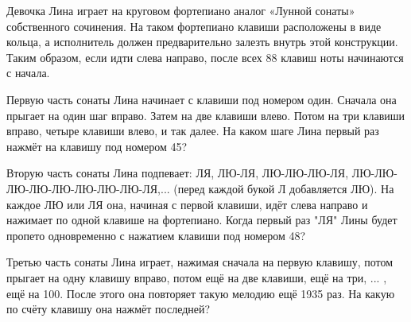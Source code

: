 ﻿

\noindent Девочка Лина играет на круговом фортепиано аналог «Лунной сонаты» собственного сочинения. На таком фортепиано клавиши расположены в виде кольца, а исполнитель должен предварительно залезть внутрь этой конструкции. Таким образом, если идти слева направо, после всех 88 клавиш ноты начинаются с начала.
\begin{itemize}

\itA Первую часть сонаты Лина начинает с клавиши под номером один. Сначала она прыгает на один шаг вправо. Затем на две клавиши влево. Потом на три клавиши вправо, четыре клавиши влево, и так далее. На каком шаге Лина первый раз нажмёт на клавишу под номером 45?

\itB Вторую часть сонаты Лина подпевает: ЛЯ, ЛЮ-ЛЯ, ЛЮ-ЛЮ-ЛЮ-ЛЯ, ЛЮ-ЛЮ-ЛЮ-ЛЮ-ЛЮ-ЛЮ-ЛЮ-ЛЮ-ЛЯ,... (перед каждой букой Л добавляется ЛЮ). На каждое ЛЮ или ЛЯ она, начиная с первой клавиши, идёт слева направо и нажимает по одной клавише на фортепиано. Когда первый раз "ЛЯ" Лины будет пропето одновременно с нажатием клавиши под номером 48?

\itC Третью часть сонаты Лина играет, нажимая сначала на первую клавишу, потом прыгает на одну клавишу вправо, потом ещё на две клавиши, ещё на три, ... , ещё на 100. После этого она повторяет такую мелодию ещё 1935 раз. На какую по счёту клавишу она нажмёт последней?
\end{itemize}